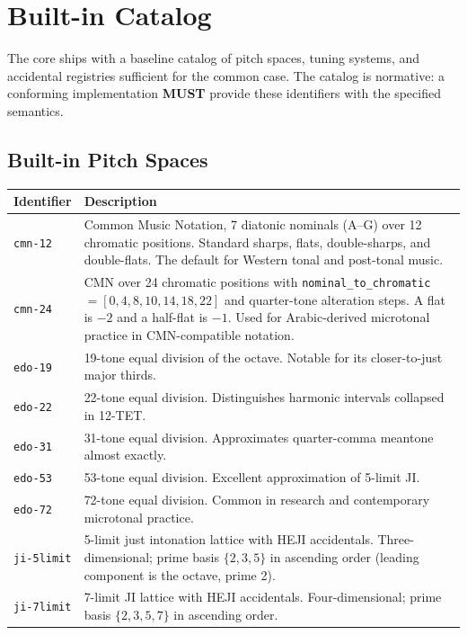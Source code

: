 \documentclass[11pt,letterpaper]{report}
\newcommand{\MUST}{\textbf{MUST}}
\begin{document}
\section{Built-in Catalog}
\label{sec:tuning:builtin}

The core ships with a baseline catalog of pitch spaces, tuning systems,
and accidental registries sufficient for the common case. The catalog
is normative: a conforming implementation \MUST{} provide these
identifiers with the specified semantics.

\subsection{Built-in Pitch Spaces}

\begin{longtable}{p{3.5cm} p{10cm}}
  \toprule
  \textbf{Identifier} & \textbf{Description} \\
  \midrule
  \endhead
  \texttt{cmn-12} & Common Music Notation, 7 diatonic nominals (A--G)
  over 12 chromatic positions. Standard sharps, flats, double-sharps,
  and double-flats. The default for Western tonal and post-tonal music. \\
  \texttt{cmn-24} & CMN over 24 chromatic positions with
  \texttt{nominal\_to\_chromatic} $=[0,4,8,10,14,18,22]$ and quarter-tone
  alteration steps. A flat is $-2$ and a half-flat is $-1$. Used for
  Arabic-derived microtonal practice in CMN-compatible notation. \\
  \texttt{edo-19} & 19-tone equal division of the octave.
  Notable for its closer-to-just major thirds. \\
  \texttt{edo-22} & 22-tone equal division. Distinguishes harmonic
  intervals collapsed in 12-TET. \\
  \texttt{edo-31} & 31-tone equal division. Approximates quarter-comma
  meantone almost exactly. \\
  \texttt{edo-53} & 53-tone equal division. Excellent approximation
  of 5-limit JI. \\
  \texttt{edo-72} & 72-tone equal division. Common in research and
  contemporary microtonal practice. \\
  \texttt{ji-5limit} & 5-limit just intonation lattice with HEJI
  accidentals. Three-dimensional; prime basis $\{2, 3, 5\}$ in
  ascending order (leading component is the octave, prime 2). \\
  \texttt{ji-7limit} & 7-limit JI lattice with HEJI accidentals.
  Four-dimensional; prime basis $\{2, 3, 5, 7\}$ in ascending order. \\

\end{longtable}
\end{document}
